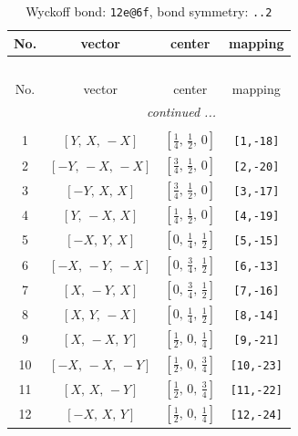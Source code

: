 \documentclass[fleqn,8pt]{jsarticle}
\begin{document}
\renewcommand{\arraystretch}{1.2}
\begin{longtable}{cccc}
\caption{Wyckoff bond: {\tt 12e@6f}, bond symmetry: {\tt ..2}}
 \\
 \hline \hline
No. & vector & center & mapping \\ \hline \endfirsthead

\multicolumn{3}{l}{\tablename\ \thetable{}} \\
 \hline \hline
No. & vector & center & mapping \\ \hline \endhead

 \hline \hline
\multicolumn{3}{r}{\footnotesize\it continued ...} \\ \endfoot

 \hline \hline
\multicolumn{3}{r}{} \\ \endlastfoot

1 & $\left[ Y,\, X,\, - X \right]$ & $\left[ \frac{1}{4},\, \frac{1}{2},\, 0 \right]$ & {\tt [1,-18]} \\ \hline
2 & $\left[ - Y,\, - X,\, - X \right]$ & $\left[ \frac{3}{4},\, \frac{1}{2},\, 0 \right]$ & {\tt [2,-20]} \\ \hline
3 & $\left[ - Y,\, X,\, X \right]$ & $\left[ \frac{3}{4},\, \frac{1}{2},\, 0 \right]$ & {\tt [3,-17]} \\ \hline
4 & $\left[ Y,\, - X,\, X \right]$ & $\left[ \frac{1}{4},\, \frac{1}{2},\, 0 \right]$ & {\tt [4,-19]} \\ \hline
5 & $\left[ - X,\, Y,\, X \right]$ & $\left[ 0,\, \frac{1}{4},\, \frac{1}{2} \right]$ & {\tt [5,-15]} \\ \hline
6 & $\left[ - X,\, - Y,\, - X \right]$ & $\left[ 0,\, \frac{3}{4},\, \frac{1}{2} \right]$ & {\tt [6,-13]} \\ \hline
7 & $\left[ X,\, - Y,\, X \right]$ & $\left[ 0,\, \frac{3}{4},\, \frac{1}{2} \right]$ & {\tt [7,-16]} \\ \hline
8 & $\left[ X,\, Y,\, - X \right]$ & $\left[ 0,\, \frac{1}{4},\, \frac{1}{2} \right]$ & {\tt [8,-14]} \\ \hline
9 & $\left[ X,\, - X,\, Y \right]$ & $\left[ \frac{1}{2},\, 0,\, \frac{1}{4} \right]$ & {\tt [9,-21]} \\ \hline
10 & $\left[ - X,\, - X,\, - Y \right]$ & $\left[ \frac{1}{2},\, 0,\, \frac{3}{4} \right]$ & {\tt [10,-23]} \\ \hline
11 & $\left[ X,\, X,\, - Y \right]$ & $\left[ \frac{1}{2},\, 0,\, \frac{3}{4} \right]$ & {\tt [11,-22]} \\ \hline
12 & $\left[ - X,\, X,\, Y \right]$ & $\left[ \frac{1}{2},\, 0,\, \frac{1}{4} \right]$ & {\tt [12,-24]} \\
\end{longtable}
\end{document}
